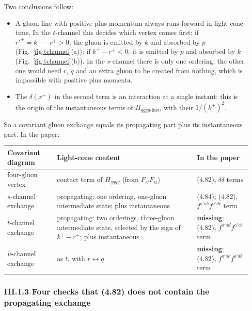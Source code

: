 Two conclusions follow:
\begin{itemize}[leftmargin=18pt,itemsep=2pt]
\item A gluon line with positive plus momentum always runs forward in light-cone time. In the $t$-channel this decides which vertex comes first: if $r'^+=k^+-r^+>0$, the gluon is emitted by $k$ and absorbed by $p$ (Fig.~\ref{fig:tchannel}(a)); if $k^+-r^+<0$, it is emitted by $p$ and absorbed by $k$ (Fig.~\ref{fig:tchannel}(b)). In the $s$-channel there is only one ordering: the other one would need $r$, $q$ and an extra gluon to be created from nothing, which is impossible with positive plus momenta.
\item The $\delta(x^+)$ in the second term is an interaction at a single instant: this is the origin of the instantaneous terms of $H_{gggg\text{-inst}}$, with their $1/(k^+)^2$.
\end{itemize}
So a covariant gluon exchange equals its propagating part plus its instantaneous part. In the paper:
\begin{center}
\small
\renewcommand{\arraystretch}{1.25}
\begin{tabular}{p{3.3cm}p{6.5cm}p{4.3cm}}
\toprule
\textbf{Covariant diagram} & \textbf{Light-cone content} & \textbf{In the paper}\\
\midrule
four-gluon vertex & contact term of $H_{gggg}$ (from $F_{ij}F_{ij}$) & (4.82), $\delta\delta$ terms\\
$s$-channel exchange & propagating: one ordering, one-gluon intermediate state; plus instantaneous & (4.84); (4.82), $f^{a'ab}f^{a'dc}$ term\\
$t$-channel exchange & propagating: two orderings, three-gluon intermediate state, selected by the sign of $k^+-r^+$; plus instantaneous & \textbf{missing}; (4.82), $f^{a'ad}f^{a'cb}$ term\\
$u$-channel exchange & as $t$, with $r\leftrightarrow q$ & \textbf{missing}; (4.82), $f^{a'ac}f^{a'db}$ term\\
\bottomrule
\end{tabular}
\end{center}

\subsubsection*{III.1.3 Four checks that (4.82) does not contain the propagating exchange}


